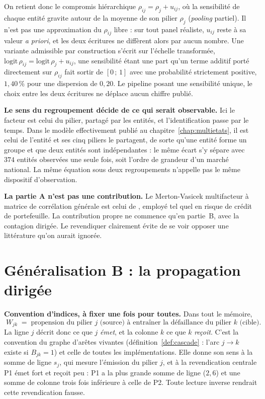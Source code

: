 On retient donc le compromis hiérarchique $\rho_{ij}=\rho_j+u_{ij}$, où la sensibilité de chaque
entité gravite autour de la moyenne de son pilier $\rho_j$ (\emph{pooling} partiel). Il n'est pas
une approximation du $\rho_{ij}$ libre : sur tout panel réaliste, $u_{ij}$ reste à sa valeur
\emph{a priori}, et les deux écritures ne diffèrent alors par aucun nombre. Une variante
admissible par construction s'écrit sur l'échelle transformée,
$\mathrm{logit}\,\rho_{ij}=\mathrm{logit}\,\rho_j+u_{ij}$, une sensibilité étant une part qu'un
terme additif porté directement sur $\rho_{ij}$ fait sortir de $[0\,;\,1]$ avec une probabilité
strictement positive, $1{,}40\,\%$ pour une dispersion de $0{,}20$. Le pipeline posant une
sensibilité unique, le choix entre les deux écritures ne déplace aucun chiffre publié.

\begin{attention}
\textbf{Le sens du regroupement décide de ce qui serait observable.} Ici le facteur est celui du
pilier, partagé par les entités, et l'identification passe par le temps. Dans le modèle
effectivement publié au chapitre~\ref{chap:multietats}, il est celui de l'entité et ses cinq
piliers le partagent, de sorte qu'une entité forme un groupe et que deux entités sont
indépendantes : le même écart s'y sépare avec $374$ entités observées une seule fois, soit
l'ordre de grandeur d'un marché national. La même équation sous deux regroupements n'appelle pas le même
dispositif d'observation.
\end{attention}

\begin{cle}
\textbf{La partie A n'est pas une contribution.} Le Merton-Vasicek multifacteur à
matrice de corrélation générale est celui de \citet{Li2000}, employé tel quel en risque de
crédit de portefeuille. La contribution propre ne commence qu'en partie~B, avec
la contagion dirigée. Le revendiquer clairement évite de se voir opposer une
littérature qu'on aurait ignorée.
\end{cle}


\section{Généralisation B : la propagation dirigée}

\begin{cle}
\textbf{Convention d'indices, à fixer une fois pour toutes.} Dans tout le mémoire,
\[
  \boxed{\;W_{jk}\;=\;\text{propension du pilier } j \text{ (source) à entraîner la
  défaillance du pilier } k \text{ (cible).}\;}
\]
La ligne $j$ décrit donc ce que $j$ \emph{émet}, et la colonne $k$ ce que $k$
\emph{reçoit}. C'est la convention du graphe d'arêtes vivantes (définition~\ref{def:cascade} :
l'arc $j\to k$ existe si $B_{jk}=1$) et celle de toutes les implémentations. Elle donne son sens
à la somme de ligne $s_j$, qui mesure l'émission du pilier $j$, et à la revendication
centrale \og{}P1 émet fort et reçoit peu\fg{} : P1 a la plus grande somme de ligne ($2{,}6$) et
une somme de colonne trois fois inférieure à celle de P2. Toute lecture inverse rendrait cette
revendication fausse.
\end{cle}

